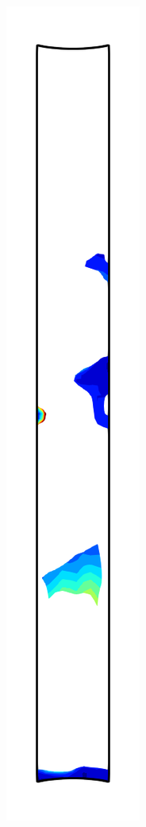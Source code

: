 \begin{figure}[!htb]
\begin{subfigure}{0.08\textwidth}
  \end{subfigure}
  \begin{subfigure}{0.08\textwidth}
    \centering
    \includegraphics[width=\textwidth]{Chapter5/figures/spallation/psii_10}

\end{subfigure}
\end{figure}
